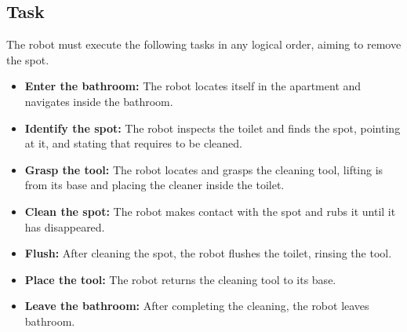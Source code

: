 \subsection{Task}
The robot must execute the following tasks in any logical order, aiming to remove the spot.
\begin{itemize}
	\item \textbf{Enter the bathroom:} The robot locates itself in the apartment and navigates inside the bathroom.
	
	\item \textbf{Identify the spot:} The robot inspects the toilet and finds the spot, pointing at it, and stating that requires to be cleaned.
	
	\item \textbf{Grasp the tool:} The robot locates and grasps the cleaning tool, lifting is from its base and placing the cleaner inside the toilet.
	
	\item \textbf{Clean the spot:} The robot makes contact with the spot and rubs it until it has disappeared.

	\item \textbf{Flush:} After cleaning the spot, the robot flushes the toilet, rinsing the tool.

	\item \textbf{Place the tool:} The robot returns the cleaning tool to its base.

	\item \textbf{Leave the bathroom:} After completing the cleaning, the robot leaves bathroom.
\end{itemize}


